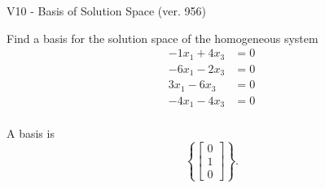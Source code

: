 \begin{exercise}
  \begin{exerciseTitle}V10 - Basis of Solution Space (ver. 956)\end{exerciseTitle}
  \begin{exerciseStatement}
    Find a basis for the solution space of the homogeneous system 
\begin{align*}
 -1 x_ 1 + 4 x_ 3 &= 0  \\ 
  -6 x_ 1 -2 x_ 3 &= 0  \\ 
  3 x_ 1 -6 x_ 3 &= 0  \\ 
  -4 x_ 1 -4 x_ 3 &= 0  \\ 
 \end{align*}


 
  \end{exerciseStatement}

  \begin{exerciseAnswer}
   A basis is   
\[\left\{\left[\begin{array}{c}
0 \\
1 \\
0
\end{array}\right]\right\}.\]

  


  \end{exerciseAnswer}
\end{exercise}
